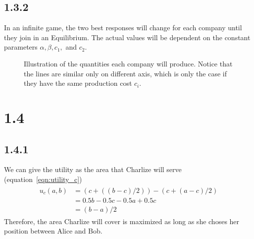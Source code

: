 \documentclass[11pt]{article}
\begin{document}
\subsection*{1.3.2}
In an infinite game, the two best responses will change for each company until they join in an Equilibrium. The actual values
will be dependent on the constant parameters $\alpha, \beta, c_1,$ and $c_2$.
\begin{figure}[h]
    \caption{Illustration of the quantities each company will produce. Notice that the lines are similar only on different axis,
    which is only the case if they have the same production cost $c_i$.}
    \end{figure}
\section*{1.4}
\subsection*{1.4.1}
We can give the utility as the area that Charlize will serve (equation~\ref{eqn:utility_c})
\begin{align}
    \begin{split}
        u_c(a, b)&=(c+((b-c)/2)) - (c+(a-c)/2)\\
        & = 0.5b - 0.5c - 0.5a + 0.5c\\
        & = (b-a)/2
    \end{split}
    \label{eqn:utility_c}    
\end{align}
Therefore, the area Charlize will cover is maximized as long as she choses her position between Alice and Bob.
\end{document}
